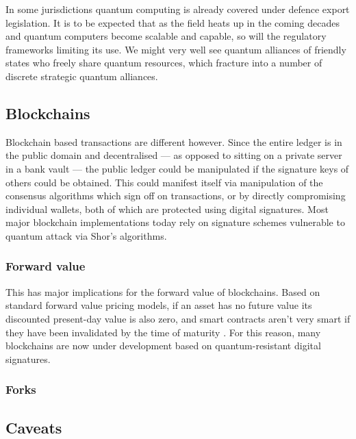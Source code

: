In some jurisdictions quantum computing is already covered under defence export legislation. It is to be expected that as the field heats up in the coming decades and quantum computers become scalable and capable, so will the regulatory frameworks limiting its use. We might very well see quantum alliances of friendly states who freely share quantum resources, which fracture into a number of discrete strategic quantum alliances.

\subsection{Blockchains} \label{blockchains}

Blockchain based transactions are different however. Since the entire ledger is in the public domain and decentralised --- as opposed to sitting on a private server in a bank vault --- the public ledger could be manipulated if the signature keys of others could be obtained. This could manifest itself via manipulation of the consensus algorithms which sign off on transactions, or by directly compromising individual wallets, both of which are protected using digital signatures. Most major blockchain implementations today rely on signature schemes vulnerable to quantum attack via Shor's algorithms.

\subsubsection{Forward value}

This has major implications for the forward value of blockchains. Based on standard forward value pricing models, if an asset has no future value its discounted present-day value is also zero, and smart contracts aren't very smart if they have been invalidated by the time of maturity \cite{bib:rohdequantcrypto}. For this reason, many blockchains are now under development based on quantum-resistant digital signatures.

\subsubsection{Forks}

\subsection{Caveats} \label{caveats}

